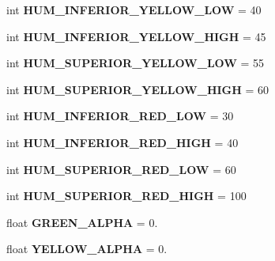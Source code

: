 \begin{DoxyCompactItemize}
int {\bfseries H\+U\+M\+\_\+\+I\+N\+F\+E\+R\+I\+O\+R\+\_\+\+Y\+E\+L\+L\+O\+W\+\_\+\+L\+OW} = 40
\item 
\mbox{\label{namespacegraph__functions_ab5c471520366799ae50dd193028f2d67}} 
int {\bfseries H\+U\+M\+\_\+\+I\+N\+F\+E\+R\+I\+O\+R\+\_\+\+Y\+E\+L\+L\+O\+W\+\_\+\+H\+I\+GH} = 45
\item 
\mbox{\label{namespacegraph__functions_acdc3cb6b8b7ba1934314036b2639e62f}} 
int {\bfseries H\+U\+M\+\_\+\+S\+U\+P\+E\+R\+I\+O\+R\+\_\+\+Y\+E\+L\+L\+O\+W\+\_\+\+L\+OW} = 55
\item 
\mbox{\label{namespacegraph__functions_a2eec5b56f9955aadafc917dd8207f2a4}} 
int {\bfseries H\+U\+M\+\_\+\+S\+U\+P\+E\+R\+I\+O\+R\+\_\+\+Y\+E\+L\+L\+O\+W\+\_\+\+H\+I\+GH} = 60
\item 
\mbox{\label{namespacegraph__functions_a5608d50aeed565e1373530eda0910987}} 
int {\bfseries H\+U\+M\+\_\+\+I\+N\+F\+E\+R\+I\+O\+R\+\_\+\+R\+E\+D\+\_\+\+L\+OW} = 30
\item 
\mbox{\label{namespacegraph__functions_a18e20dd285a11cca36ff12f019e69958}} 
int {\bfseries H\+U\+M\+\_\+\+I\+N\+F\+E\+R\+I\+O\+R\+\_\+\+R\+E\+D\+\_\+\+H\+I\+GH} = 40
\item 
\mbox{\label{namespacegraph__functions_abdb1bf0bd48e84a44fc164a350e9dddf}} 
int {\bfseries H\+U\+M\+\_\+\+S\+U\+P\+E\+R\+I\+O\+R\+\_\+\+R\+E\+D\+\_\+\+L\+OW} = 60
\item 
\mbox{\label{namespacegraph__functions_af2f3e79135ff24e56fa64533570e0bf2}} 
int {\bfseries H\+U\+M\+\_\+\+S\+U\+P\+E\+R\+I\+O\+R\+\_\+\+R\+E\+D\+\_\+\+H\+I\+GH} = 100
\item 
\mbox{\label{namespacegraph__functions_ab1d88c9dbd61278c65306f3acb8f7be8}} 
float {\bfseries G\+R\+E\+E\+N\+\_\+\+A\+L\+P\+HA} = 0.
\item 
\mbox{\label{namespacegraph__functions_a963e8046bd4a88272ff9d3df1300496b}} 
float {\bfseries Y\+E\+L\+L\+O\+W\+\_\+\+A\+L\+P\+HA} = 0.

\end{DoxyCompactItemize}
